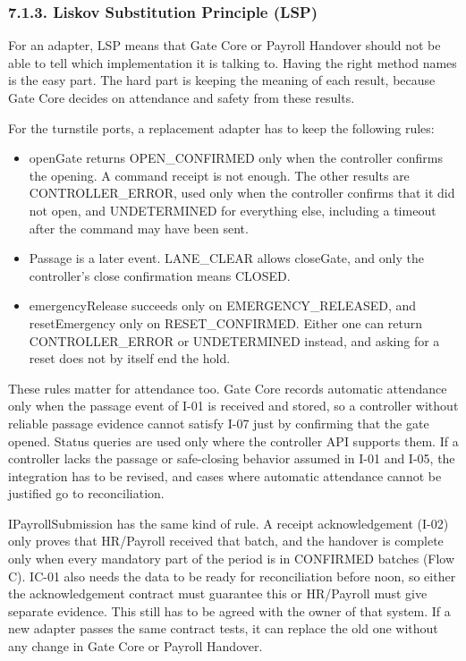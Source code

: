 \subsubsection*{7.1.3. Liskov Substitution Principle (LSP)}

{}

For an adapter, LSP means that Gate Core or Payroll Handover should not be able to tell which implementation it is talking to. Having the right method names is the easy part. The hard part is keeping the meaning of each result, because Gate Core decides on attendance and safety from these results.

For the turnstile ports, a replacement adapter has to keep the following rules:

\begin{itemize}[leftmargin=36pt, itemsep=2pt, topsep=4pt, parsep=2pt]
  \item openGate returns OPEN\_CONFIRMED only when the controller confirms the opening. A command receipt is not enough. The other results are CONTROLLER\_ERROR, used only when the controller confirms that it did not open, and UNDETERMINED for everything else, including a timeout after the command may have been sent.
  \item Passage is a later event. LANE\_CLEAR allows closeGate, and only the controller's close confirmation means CLOSED.
  \item emergencyRelease succeeds only on EMERGENCY\_RELEASED, and resetEmergency only on RESET\_CONFIRMED. Either one can return CONTROLLER\_ERROR or UNDETERMINED instead, and asking for a reset does not by itself end the hold.
\end{itemize}

These rules matter for attendance too. Gate Core records automatic attendance only when the passage event of I-01 is received and stored, so a controller without reliable passage evidence cannot satisfy I-07 just by confirming that the gate opened. Status queries are used only where the controller API supports them. If a controller lacks the passage or safe-closing behavior assumed in I-01 and I-05, the integration has to be revised, and cases where automatic attendance cannot be justified go to reconciliation.

IPayrollSubmission has the same kind of rule. A receipt acknowledgement (I-02) only proves that HR/Payroll received that batch, and the handover is complete only when every mandatory part of the period is in CONFIRMED batches (Flow C). IC-01 also needs the data to be ready for reconciliation before noon, so either the acknowledgement contract must guarantee this or HR/Payroll must give separate evidence. This still has to be agreed with the owner of that system. If a new adapter passes the same contract tests, it can replace the old one without any change in Gate Core or Payroll Handover.

